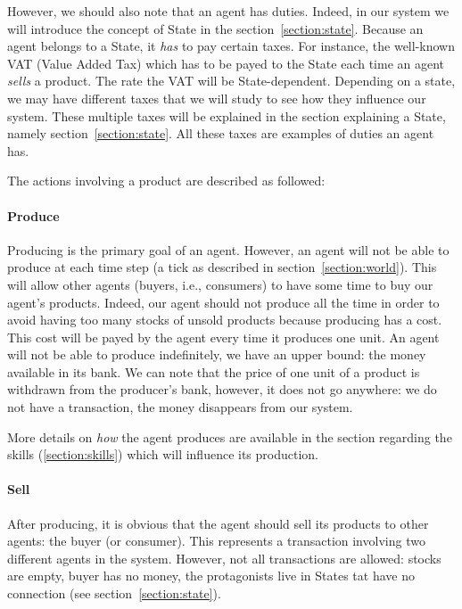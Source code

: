 \documentclass[20pt]{article}
\begin{document}
However, we should also note that an agent has duties. Indeed, in our system we will introduce the concept of State in the section~\ref{section:state}. Because an agent belongs to a State, it \emph{has} to pay certain taxes. 
For instance, the well-known VAT (Value Added Tax) which has to be payed to the State each time an agent \emph{sells} a product. The rate the VAT will be State-dependent. Depending on a state, we may have different taxes that we will study to see how they influence our system. These multiple taxes will be explained in the section explaining a State, namely section~\ref{section:state}. All these taxes are examples of duties an agent has.

The actions involving a product are described as followed:

\paragraph{Produce}
Producing is the primary goal of an agent. However, an agent will not be able to produce at each time step (a tick as described in section~\ref{section:world}).
This will allow other agents (buyers, i.e., consumers) to have some time to buy our agent's products. Indeed, our agent should not produce all the time in order to avoid having too many stocks of unsold products because producing has a cost. This cost will be payed by the agent every time it produces one unit. 
An agent will not be able to produce indefinitely, we have an upper bound: the money available in its bank. We can note that the price of one unit of a product is withdrawn from the producer's bank, however, it does not go anywhere: we do not have a transaction, the money disappears from our system.

More details on \emph{how} the agent produces are available in the section regarding the skills (\ref{section:skills}) which will influence its production.

\paragraph{Sell}
After producing, it is obvious that the agent should sell its products to other agents: the buyer (or consumer). This represents a transaction involving two different agents in the system. However, not all transactions are allowed: stocks are empty, buyer has no money, the protagonists live in States tat have no connection (see section~\ref{section:state}).
\end{document}
